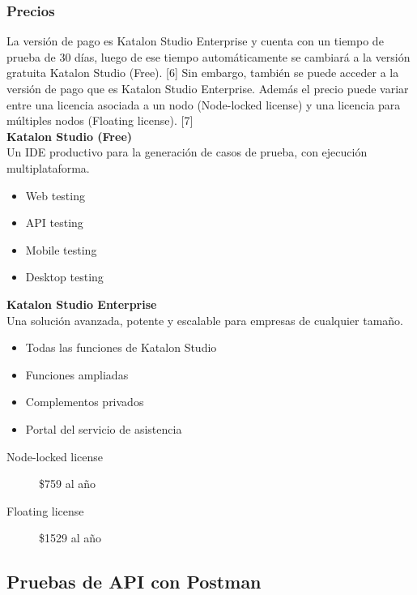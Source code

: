 \documentclass[twoside,twocolumn]{article}
\begin{document}
\subsubsection{Precios}

La versión de pago es Katalon Studio Enterprise y cuenta con un tiempo de prueba de 30 días, luego de ese tiempo automáticamente se cambiará a la versión gratuita Katalon Studio (Free). [6] Sin embargo, también se puede acceder a la versión de pago que es Katalon Studio Enterprise. Además el precio puede variar entre una licencia asociada a un nodo (Node-locked license) y una licencia para múltiples nodos (Floating license). [7] \\

\textbf{Katalon Studio (Free)} \\

Un IDE productivo para la generación de casos de prueba,
con ejecución multiplataforma.

\begin{itemize}
  \item Web testing
  \item API testing
  \item Mobile testing
  \item Desktop testing
\end{itemize}

\textbf{Katalon Studio Enterprise} \\

Una solución avanzada, potente y escalable para empresas de cualquier tamaño.

\begin{itemize}
  \item Todas las funciones de Katalon Studio
  \item Funciones ampliadas
  \item Complementos privados
  \item Portal del servicio de asistencia
\end{itemize}

\begin{description}
  \item[Node-locked license] \$759 al año
  \item[Floating license] \$1529 al año
\end{description}

\subsection{Pruebas de API con Postman}
\end{document}

